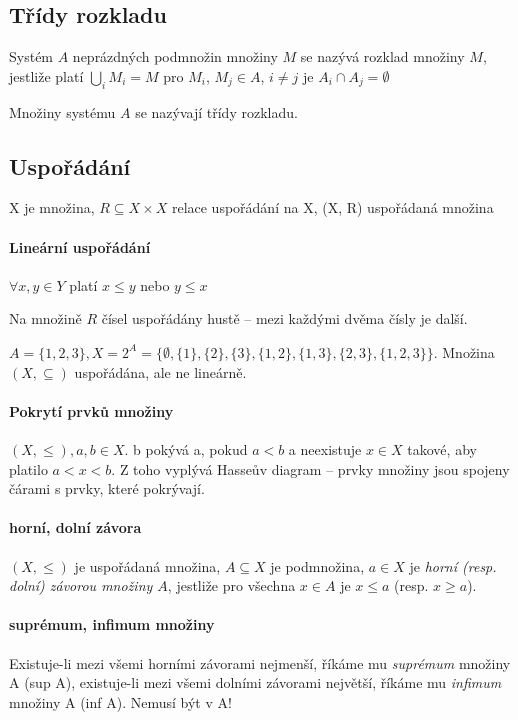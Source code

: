 \documentclass[a4wide]{report}
\begin{document}
\subsection{Třídy rozkladu}

Systém $A$ neprázdných podmnožin množiny $M$ se nazývá rozklad množiny $M$, jestliže platí $\bigcup_i M_i = M$ pro $M_i$, $M_j \in A$, $i \neq j$ je $A_i \cap A_j = \emptyset$

Množiny systému $A$ se nazývají třídy rozkladu.

\subsection{Uspořádání}

X je množina, $R \subseteq X \times X$ relace uspořádání na X, (X, R) uspořádaná množina

\paragraph{Lineární uspořádání}

$\forall x,y \in Y$ platí $x \leq y$ nebo $y \leq x$

Na množině $R$ čísel uspořádány hustě -- mezi každými dvěma čísly je další.

$A = \{1,2,3\}, X = 2^A = \{\emptyset, \{1\}, \{2\}, \{3\}, \{1, 2\}, \{1, 3\}, \{2, 3\}, \{1, 2, 3\} \}$. Množina $(X, \subseteq)$ uspořádána, ale ne lineárně.

\paragraph{Pokrytí prvků množiny}
$(X, \leq), a,b \in X$. b pokývá a, pokud $a < b$ a neexistuje $x \in X$ takové, aby platilo $a < x < b$. Z toho vyplývá Hasseův diagram -- prvky množiny jsou spojeny čárami s prvky, které pokrývají.

\paragraph{horní, dolní závora}
$(X, \leq)$ je uspořádaná množina, $A \subseteq X$ je podmnožina, $a \in X$ je \emph{horní (resp. dolní) závorou množiny $A$}, jestliže pro všechna $x \in A$ je $x \leq a$ (resp. $x \geq a$).

\paragraph{suprémum, infimum množiny}
Existuje-li mezi všemi horními závorami nejmenší, říkáme mu \emph{suprémum} množiny A (sup A), existuje-li mezi všemi dolními závorami největší, říkáme mu \emph{infimum} množiny A (inf A). Nemusí být v A!
\end{document}
